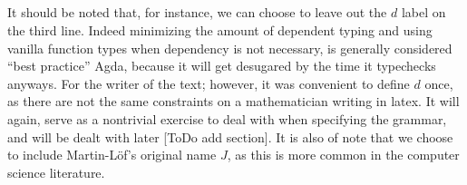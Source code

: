 \documentclass[11pt, a4paper]{article}
\begin{document}
\begin{code}%
\>[0]\<%
\\
\>[0][@{}l@{\AgdaIndent{1}}]%
\>[2]\AgdaSpace{}%
\AgdaSymbol{:}%
\>[275I]\AgdaSymbol{\{}\AgdaSpace{}%
\AgdaSymbol{:}\AgdaSpace{}%
\AgdaSymbol{\}}\<%
\\
\>[.][@{}l@{}]\<[275I]%
\>[6]\AgdaSpace{}%
\AgdaSymbol{(}\AgdaSpace{}%
\AgdaSymbol{:}\AgdaSpace{}%
\AgdaSymbol{(}\AgdaSpace{}%
\AgdaSpace{}%
\AgdaSymbol{:}\AgdaSpace{}%
\AgdaSymbol{)}\AgdaSpace{}%
\AgdaSpace{}%
\AgdaSymbol{(}\AgdaSpace{}%
\AgdaSpace{}%
\AgdaSymbol{)}\AgdaSpace{}%
%
\>[36]\AgdaSymbol{)}\<%
\\
%
\>[6]\AgdaSpace{}%
\AgdaSymbol{((}\AgdaSpace{}%
\AgdaSymbol{:}\AgdaSpace{}%
\AgdaSymbol{)}\AgdaSpace{}%
\AgdaSpace{}%
\AgdaSymbol{(}\AgdaSpace{}%
\AgdaSpace{}%
\AgdaSpace{}%
\AgdaSpace{}%
\AgdaSymbol{))}\AgdaSpace{}%
\<%
\\
%
\>[6]\AgdaSpace{}%
\AgdaSymbol{(}\AgdaSpace{}%
\AgdaSpace{}%
\AgdaSymbol{:}\AgdaSpace{}%
\AgdaSymbol{)}\<%
\\
%
\>[6]\AgdaSpace{}%
\AgdaSymbol{(}\AgdaSpace{}%
\AgdaSymbol{:}\AgdaSpace{}%
\AgdaSpace{}%
\AgdaSpace{}%
\AgdaSymbol{)}\<%
\\
%
\>[6]\AgdaComment{------------------------------------}\<%
\\
%
\>[6]\AgdaSpace{}%
\AgdaSpace{}%
\AgdaSpace{}%
\AgdaSpace{}%
\<%
\\
%
\>[2]\AgdaSpace{}%
\AgdaSpace{}%
\AgdaSpace{}%
\AgdaSpace{}%
\AgdaSpace{}%
\AgdaSpace{}%
\AgdaSymbol{=}\AgdaSpace{}%
\AgdaSpace{}%
\<%
\\
\>[0]\<%
\end{code}

It should be noted that, for instance, we can choose to leave out the $d$ label
on the third line. Indeed minimizing the amount of dependent typing and using
vanilla function types when dependency is not necessary, is generally
considered ``best practice'' Agda, because it will get desugared by the time it
typechecks anyways. For the writer of the text; however, it was convenient to
define $d$ once, as there are not the same constraints on a mathematician
writing in latex. It will again, serve as a nontrivial exercise to deal with
when specifying the grammar, and will be dealt with later [ToDo add section].
It is also of note that we choose to include Martin-Löf's original name $J$, as
this is more common in the computer science literature.
\end{document}
